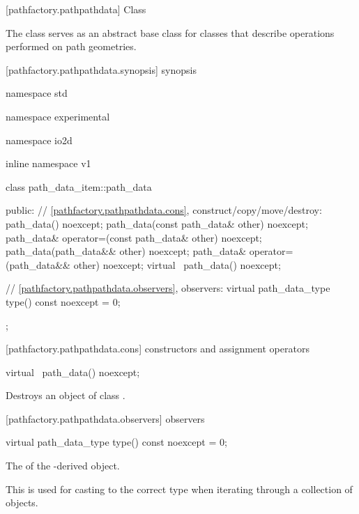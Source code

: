  [pathfactory.pathpathdata] {Class }

\pnum
{}
The class  serves as an abstract base class for classes that describe operations performed on path geometries.

 [pathfactory.pathpathdata.synopsis] { synopsis}

\begin{codeblock}
namespace std { namespace experimental { namespace io2d { inline namespace v1 {
  class path_data_item::path_data {
  public:
    // \ref{pathfactory.pathpathdata.cons}, construct/copy/move/destroy:
    path_data() noexcept;
    path_data(const path_data& other) noexcept;
    path_data& operator=(const path_data& other) noexcept;
    path_data(path_data&& other) noexcept;
    path_data& operator=(path_data&& other) noexcept;
    virtual ~path_data() noexcept;

    // \ref{pathfactory.pathpathdata.observers}, observers:
    virtual path_data_type type() const noexcept = 0;
  };
} } } }
\end{codeblock}

 [pathfactory.pathpathdata.cons] { constructors and assignment operators}

\begin{itemdecl}
    virtual ~path_data() noexcept;
\end{itemdecl}
\begin{itemdescr}
	\pnum
	\effects
	Destroys an object of class .
\end{itemdescr}

 [pathfactory.pathpathdata.observers]{ observers}

\begin{itemdecl}
    virtual path_data_type type() const noexcept = 0;
\end{itemdecl}
\begin{itemdescr}
	\pnum
	\returns
	The  of the -derived object.
	
	\pnum
	\realnote
	This is used for casting to the correct type when iterating through a collection of  objects.
\end{itemdescr}

